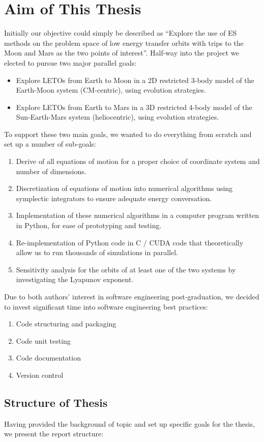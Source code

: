 \section{Aim of This Thesis}
Initially our objective could simply be described as ``Explore the use of ES methods on the problem space of low energy transfer orbits with trips to the Moon and Mars as the two points of interest''. Half-way into the project we elected to pursue two major parallel goals:
\begin{itemize}
	\item Explore LETOs from Earth to Moon in a 2D restricted 3-body model of the Earth-Moon system (CM-centric), using evolution strategies.
	\item Explore LETOs from Earth to Mars in a 3D restricted 4-body model of the Sun-Earth-Mars system (heliocentric), using evolution strategies.
\end{itemize}
To support these two main goals, we wanted to do everything from scratch and set up a number of sub-goals:
\begin{enumerate}
	\item Derive of all equations of motion for a proper choice of coordinate system and number of dimensions.
	\item Discretization of equations of motion into numerical algorithms using symplectic integrators to ensure adequate energy conversation.
	\item Implementation of these numerical algorithms in a computer program written in Python, for ease of prototyping and testing.
	\item Re-implementation of Python code in C / CUDA code that theoretically allow us to run thousands of simulations in parallel.
	\item Sensitivity analysis for the orbits of at least one of the two systems by investigating the Lyapunov exponent.
\end{enumerate}
Due to both authors' interest in software engineering post-graduation, we decided to invest significant time into software engineering best practices:
\begin{enumerate}
	\item Code structuring and packaging
	\item Code unit testing 
	\item Code documentation
	\item Version control
\end{enumerate}

\subsection{Structure of Thesis}
Having provided the background of topic and set up specific goals for the thesis, we present the  report structure:

